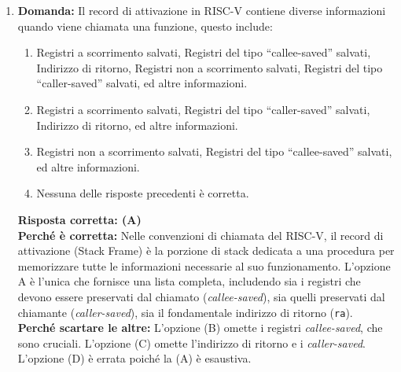 \documentclass[12pt, a4paper]{article}
\begin{document}
\begin{enumerate}

    \item \textbf{Domanda:} Il record di attivazione in RISC-V contiene diverse informazioni quando viene chiamata una funzione, questo include:
    \begin{enumerate}[label=(\Alph*)]
        \item Registri a scorrimento salvati, Registri del tipo ``callee-saved'' salvati, Indirizzo di ritorno, Registri non a scorrimento salvati, Registri del tipo ``caller-saved'' salvati, ed altre informazioni.
        \item Registri a scorrimento salvati, Registri del tipo ``caller-saved'' salvati, Indirizzo di ritorno, ed altre informazioni.
        \item Registri non a scorrimento salvati, Registri del tipo ``callee-saved'' salvati, ed altre informazioni.
        \item Nessuna delle risposte precedenti è corretta.
    \end{enumerate}
    \textbf{Risposta corretta: (A)} \\
    \textbf{Perché è corretta:} Nelle convenzioni di chiamata del RISC-V, il record di attivazione (Stack Frame) è la porzione di stack dedicata a una procedura per memorizzare tutte le informazioni necessarie al suo funzionamento. L'opzione A è l'unica che fornisce una lista completa, includendo sia i registri che devono essere preservati dal chiamato (\textit{callee-saved}), sia quelli preservati dal chiamante (\textit{caller-saved}), sia il fondamentale indirizzo di ritorno (\texttt{ra}). \\
    \textbf{Perché scartare le altre:} L'opzione (B) omette i registri \textit{callee-saved}, che sono cruciali. L'opzione (C) omette l'indirizzo di ritorno e i \textit{caller-saved}. L'opzione (D) è errata poiché la (A) è esaustiva.


\end{enumerate}
\end{document}
